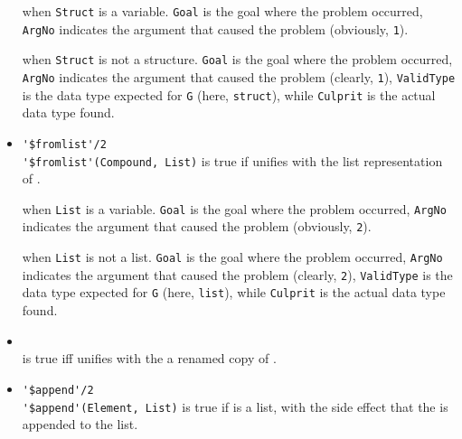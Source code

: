\begin{itemize}

     when \texttt{Struct} is a variable. \texttt{Goal} is the goal where the problem occurred, \texttt{ArgNo} indicates the argument that caused the problem (obviously, \texttt{1}).

     when \texttt{Struct} is not a structure. \texttt{Goal} is the goal where the problem occurred, \texttt{ArgNo} indicates the argument that caused the problem (clearly, \texttt{1}), \texttt{ValidType} is the data type expected for \texttt{G} (here, \texttt{struct}), while \texttt{Culprit} is the actual data type found.

\item \verb|'$fromlist'/2|\\
    \noindent\verb|'$fromlist'(Compound, List)| is true if  unifies with the list representation of .


     when \texttt{List} is a variable. \texttt{Goal} is the goal where the problem occurred, \texttt{ArgNo} indicates the argument that caused the problem (obviously, \texttt{2}).

     when \texttt{List} is not a list. \texttt{Goal} is the goal where the problem occurred, \texttt{ArgNo} indicates the argument that caused the problem (clearly, \texttt{2}), \texttt{ValidType} is the data type expected for \texttt{G} (here, \texttt{list}), while \texttt{Culprit} is the actual data type found.

\item {}\\
    \noindent{} is true iff  unifies with the a renamed copy of .


\item \verb|'$append'/2|\\
    \noindent\verb|'$append'(Element, List)| is true if  is a list, with the side effect that the  is appended to the list.


\end{itemize}
